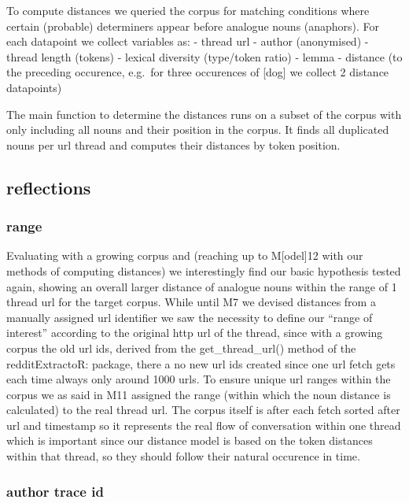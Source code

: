 \documentclass[
]{article}
\begin{document}
To compute distances we queried the corpus for matching conditions where certain (probable) determiners appear before analogue nouns (anaphors). For each datapoint we collect variables as:
- thread url
- author (anonymised)
- thread length (tokens)
- lexical diversity (type/token ratio)
- lemma
- distance (to the preceding occurence, e.g.~for three occurences of {[}dog{]} we collect 2 distance datapoints)

The main function to determine the distances runs on a subset of the corpus with only including all nouns and their position in the corpus. It finds all duplicated nouns per url thread and computes their distances by token position.

\subsection{reflections}\label{reflections}

\subsubsection{range}\label{range}

Evaluating with a growing corpus and (reaching up to M{[}odel{]}12 with our methods of computing distances) we interestingly find our basic hypothesis tested again, showing an overall larger distance of analogue nouns within the range of 1 thread url for the target corpus. While until M7 we devised distances from a manually assigned url identifier we saw the necessity to define our ``range of interest'' according to the original http url of the thread, since with a growing corpus the old url ids, derived from the get\_thread\_url() method of the redditExtractoR: package, there a no new url ids created since one url fetch gets each time always only around 1000 urls. To ensure unique url ranges within the corpus we as said in M11 assigned the range (within which the noun distance is calculated) to the real thread url. The corpus itself is after each fetch sorted after url and timestamp so it represents the real flow of conversation within one thread which is important since our distance model is based on the token distances within that thread, so they should follow their natural occurence in time.

\subsubsection{author trace id}\label{author-trace-id}
\end{document}
